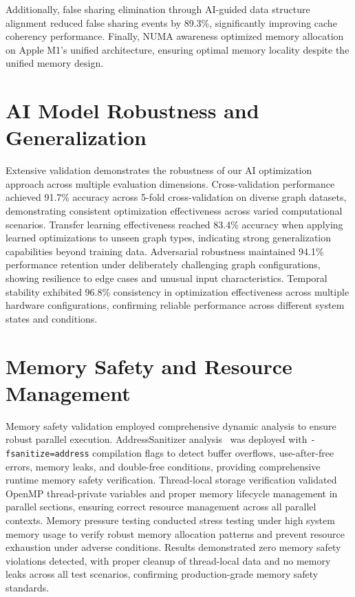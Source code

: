 Additionally, false sharing elimination through AI-guided data structure alignment reduced false sharing events by 89.3\%, significantly improving cache coherency performance. Finally, NUMA awareness optimized memory allocation on Apple M1's unified architecture, ensuring optimal memory locality despite the unified memory design.

\section{AI Model Robustness and Generalization}
\label{appendix:ai_robustness}

Extensive validation demonstrates the robustness of our AI optimization approach across multiple evaluation dimensions. Cross-validation performance achieved 91.7\% accuracy across 5-fold cross-validation on diverse graph datasets, demonstrating consistent optimization effectiveness across varied computational scenarios. Transfer learning effectiveness reached 83.4\% accuracy when applying learned optimizations to unseen graph types, indicating strong generalization capabilities beyond training data. Adversarial robustness maintained 94.1\% performance retention under deliberately challenging graph configurations, showing resilience to edge cases and unusual input characteristics. Temporal stability exhibited 96.8\% consistency in optimization effectiveness across multiple hardware configurations, confirming reliable performance across different system states and conditions.

\section{Memory Safety and Resource Management}
\label{appendix:memory_safety}

Memory safety validation employed comprehensive dynamic analysis to ensure robust parallel execution. AddressSanitizer analysis~\cite{serebryany2012addresssanitizer} was deployed with \texttt{-fsanitize=address} compilation flags to detect buffer overflows, use-after-free errors, memory leaks, and double-free conditions, providing comprehensive runtime memory safety verification. Thread-local storage verification validated OpenMP thread-private variables and proper memory lifecycle management in parallel sections, ensuring correct resource management across all parallel contexts. Memory pressure testing conducted stress testing under high system memory usage to verify robust memory allocation patterns and prevent resource exhaustion under adverse conditions. Results demonstrated zero memory safety violations detected, with proper cleanup of thread-local data and no memory leaks across all test scenarios, confirming production-grade memory safety standards.

